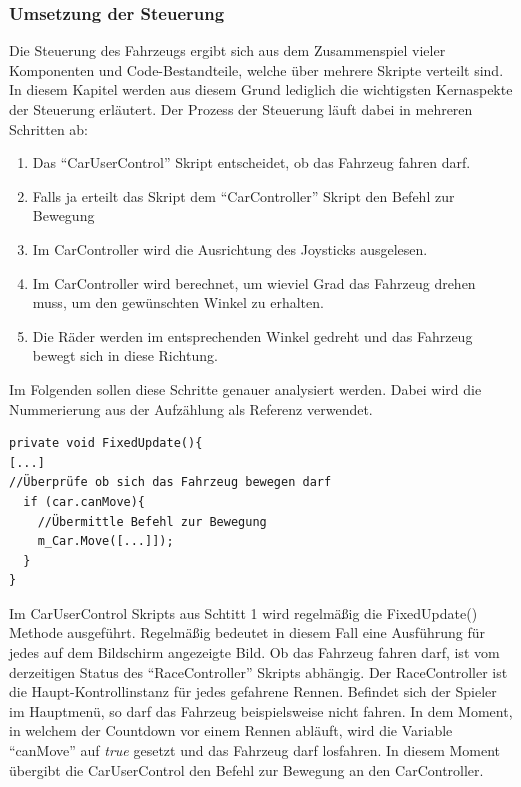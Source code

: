 	\subsubsection{Umsetzung der Steuerung}
	Die Steuerung des Fahrzeugs ergibt sich aus dem Zusammenspiel vieler Komponenten und Code-Bestandteile, welche über mehrere Skripte verteilt sind. In diesem Kapitel werden aus diesem Grund lediglich die wichtigsten Kernaspekte der Steuerung erläutert. Der Prozess der Steuerung läuft dabei in mehreren Schritten ab:
	\begin{enumerate}
		\item{ Das \enquote{CarUserControl} Skript entscheidet, ob das Fahrzeug fahren darf.}
		\item{ Falls ja erteilt das Skript dem \enquote{CarController} Skript den Befehl zur Bewegung}
		\item{ Im CarController wird die Ausrichtung des Joysticks ausgelesen.}
		\item{ Im CarController wird berechnet, um wieviel Grad das Fahrzeug drehen muss, um den gewünschten Winkel zu erhalten.}
		\item{ Die Räder werden im entsprechenden Winkel gedreht und das Fahrzeug bewegt sich in diese Richtung.}
	\end{enumerate}
	Im Folgenden sollen diese Schritte genauer analysiert werden. Dabei wird die Nummerierung aus der Aufzählung als Referenz verwendet.
	\begin{lstlisting}
private void FixedUpdate(){
[...]
//Überprüfe ob sich das Fahrzeug bewegen darf
  if (car.canMove){
    //Übermittle Befehl zur Bewegung
    m_Car.Move([...]]);
  }
}
	\end{lstlisting}
	Im CarUserControl Skripts aus Schtitt 1 wird regelmäßig die FixedUpdate() Methode ausgeführt. Regelmäßig bedeutet in diesem Fall eine Ausführung für jedes auf dem Bildschirm angezeigte Bild. Ob das Fahrzeug fahren darf, ist vom derzeitigen Status des \enquote{RaceController} Skripts abhängig. Der RaceController ist die Haupt-Kontrollinstanz für jedes gefahrene Rennen. Befindet sich der Spieler im Hauptmenü, so darf das Fahrzeug beispielsweise nicht fahren. In dem Moment, in welchem der Countdown vor einem Rennen abläuft, wird die Variable \enquote{canMove} auf \emph{true} gesetzt und das Fahrzeug darf losfahren. In diesem Moment übergibt die CarUserControl den Befehl zur Bewegung an den CarController.

